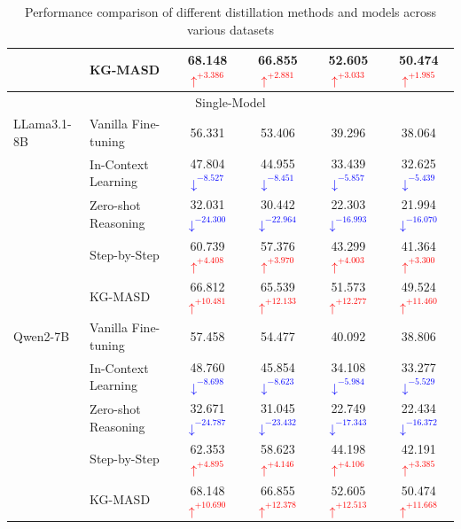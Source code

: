\documentclass[preprint,12pt]{elsarticle}
\def\textbf#1{#1}%
\begin{document}
\begin{table}[ht]
{\begin{tabular}{llcccc}
 & KG-MASD & \textbf{68.148}\textcolor{red}{$\uparrow^{+3.386}$} & \textbf{66.855}\textcolor{red}{$\uparrow^{+2.881}$} & \textbf{52.605}\textcolor{red}{$\uparrow^{+3.033}$} & \textbf{50.474}\textcolor{red}{$\uparrow^{+1.985}$} \\
\midrule
\multicolumn{6}{c}{\textbf{Single-Model}} \\
\midrule
LLama3.1-8B & Vanilla Fine-tuning & 56.331 & 53.406 & 39.296 & 38.064 \\
 & In-Context Learning & 47.804\textcolor{blue}{$\downarrow^{-8.527}$} & 44.955\textcolor{blue}{$\downarrow^{-8.451}$} & 33.439\textcolor{blue}{$\downarrow^{-5.857}$} & 32.625\textcolor{blue}{$\downarrow^{-5.439}$} \\
 & Zero-shot Reasoning & 32.031\textcolor{blue}{$\downarrow^{-24.300}$} & 30.442\textcolor{blue}{$\downarrow^{-22.964}$} & 22.303\textcolor{blue}{$\downarrow^{-16.993}$} & 21.994\textcolor{blue}{$\downarrow^{-16.070}$} \\
 & Step-by-Step & 60.739\textcolor{red}{$\uparrow^{+4.408}$} & 57.376\textcolor{red}{$\uparrow^{+3.970}$} & 43.299\textcolor{red}{$\uparrow^{+4.003}$} & 41.364\textcolor{red}{$\uparrow^{+3.300}$} \\
 & KG-MASD & \textbf{66.812}\textcolor{red}{$\uparrow^{+10.481}$} & \textbf{65.539}\textcolor{red}{$\uparrow^{+12.133}$} & \textbf{51.573}\textcolor{red}{$\uparrow^{+12.277}$} & \textbf{49.524}\textcolor{red}{$\uparrow^{+11.460}$} \\
\midrule
Qwen2-7B & Vanilla Fine-tuning & 57.458 & 54.477 & 40.092 & 38.806 \\
 & In-Context Learning & 48.760\textcolor{blue}{$\downarrow^{-8.698}$} & 45.854\textcolor{blue}{$\downarrow^{-8.623}$} & 34.108\textcolor{blue}{$\downarrow^{-5.984}$} & 33.277\textcolor{blue}{$\downarrow^{-5.529}$} \\
 & Zero-shot Reasoning & 32.671\textcolor{blue}{$\downarrow^{-24.787}$} & 31.045\textcolor{blue}{$\downarrow^{-23.432}$} & 22.749\textcolor{blue}{$\downarrow^{-17.343}$} & 22.434\textcolor{blue}{$\downarrow^{-16.372}$} \\
 & Step-by-Step & 62.353\textcolor{red}{$\uparrow^{+4.895}$} & 58.623\textcolor{red}{$\uparrow^{+4.146}$} & 44.198\textcolor{red}{$\uparrow^{+4.106}$} & 42.191\textcolor{red}{$\uparrow^{+3.385}$} \\
 & KG-MASD & \textbf{68.148}\textcolor{red}{$\uparrow^{+10.690}$} & \textbf{66.855}\textcolor{red}{$\uparrow^{+12.378}$} & \textbf{52.605}\textcolor{red}{$\uparrow^{+12.513}$} & \textbf{50.474}\textcolor{red}{$\uparrow^{+11.668}$} \\
\bottomrule
\end{tabular}%
}
\caption{Performance comparison of different distillation methods and models across various datasets}
\label{tab:all_performance}
\end{table}
\end{document}

